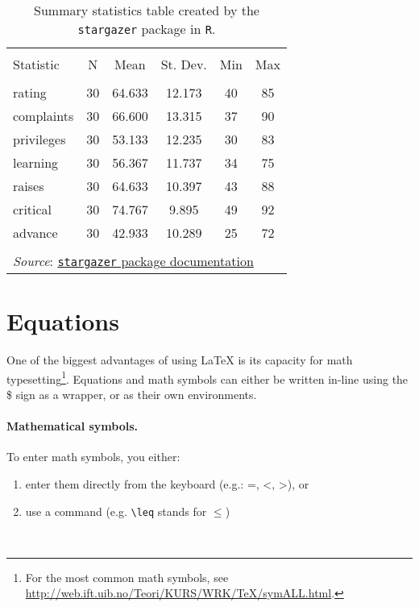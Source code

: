 \documentclass[11pt]{article}
\begin{document}
\begin{table}[H] \centering
     \caption{Summary statistics table created by the \texttt{stargazer} package in \texttt{R}.}
     \label{}
    \begin{tabular}{@{\extracolsep{5pt}}lccccc}
    \\[-1.8ex]\hline
    \hline \\[-1.8ex]
    Statistic & \multicolumn{1}{c}{N} & \multicolumn{1}{c}{Mean} & \multicolumn{1}{c}{St. Dev.} & \multicolumn{1}{c}{Min} & \multicolumn{1}{c}{Max} \\
    \hline \\[-1.8ex]
    rating & 30 & 64.633 & 12.173 & 40 & 85 \\
    complaints & 30 & 66.600 & 13.315 & 37 & 90 \\
    privileges & 30 & 53.133 & 12.235 & 30 & 83 \\
    learning & 30 & 56.367 & 11.737 & 34 & 75 \\
    raises & 30 & 64.633 & 10.397 & 43 & 88 \\
    critical & 30 & 74.767 & 9.895 & 49 & 92 \\
    advance & 30 & 42.933 & 10.289 & 25 & 72 \\
    \hline \\[-1.8ex]
    \multicolumn{6}{l}{\textit{Source}: \href{https://mran.revolutionanalytics.com/snapshot/2018-05-03/web/checks/check_results_stargazer.html}{\texttt{stargazer} package documentation}}\\
    \end{tabular}
\end{table}

\section*{Equations}

One of the biggest advantages of using {\LaTeX} is its capacity for math typesetting\footnote{For the most common math symbols, see \url{http://web.ift.uib.no/Teori/KURS/WRK/TeX/symALL.html}.}. Equations and math symbols can either be written in-line using the \$ sign as a wrapper, or as their own environments.

\paragraph{Mathematical symbols.} To enter math symbols, you either:

\begin{enumerate}
    \item enter them directly from the keyboard (e.g.: =, <, >), or
    \item use a command (e.g. \verb|\leq| stands for $\leq$)
\end{enumerate}\\\vspace{1em}
\end{document}
